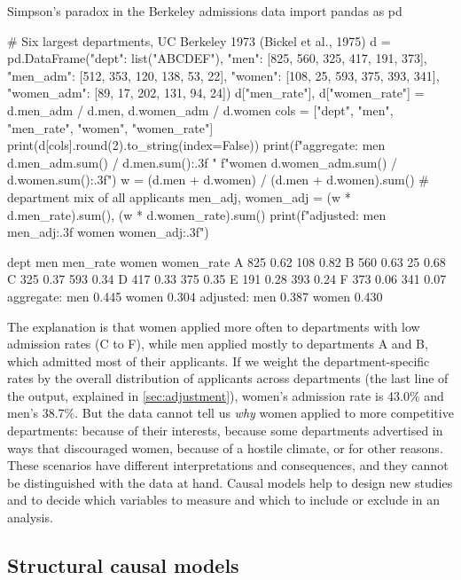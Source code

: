 \begin{pylisting}[label={lst:berkeley}]{Simpson's paradox in the Berkeley admissions data}
import pandas as pd

# Six largest departments, UC Berkeley 1973 (Bickel et al., 1975)
d = pd.DataFrame({"dept": list("ABCDEF"),
                  "men": [825, 560, 325, 417, 191, 373],
                  "men_adm": [512, 353, 120, 138, 53, 22],
                  "women": [108, 25, 593, 375, 393, 341],
                  "women_adm": [89, 17, 202, 131, 94, 24]})
d["men_rate"], d["women_rate"] = d.men_adm / d.men, d.women_adm / d.women
cols = ["dept", "men", "men_rate", "women", "women_rate"]
print(d[cols].round(2).to_string(index=False))
print(f"aggregate:   men {d.men_adm.sum() / d.men.sum():.3f}   "
      f"women {d.women_adm.sum() / d.women.sum():.3f}")
w = (d.men + d.women) / (d.men + d.women).sum()          # department mix of all applicants
men_adj, women_adj = (w * d.men_rate).sum(), (w * d.women_rate).sum()
print(f"adjusted:    men {men_adj:.3f}   women {women_adj:.3f}")
\end{pylisting}
\begin{pyoutput}
dept  men  men_rate  women  women_rate
   A  825      0.62    108        0.82
   B  560      0.63     25        0.68
   C  325      0.37    593        0.34
   D  417      0.33    375        0.35
   E  191      0.28    393        0.24
   F  373      0.06    341        0.07
aggregate:   men 0.445   women 0.304
adjusted:    men 0.387   women 0.430
\end{pyoutput}

The explanation is that women applied more often to departments with low admission rates (C to
F), while men applied mostly to departments A and B, which admitted most of their applicants.
If we weight the department-specific rates by the overall distribution of applicants across
departments (the last line of the output, explained in \cref{sec:adjustment}), women's admission
rate is 43.0\% and men's 38.7\%. But the data cannot tell us \emph{why} women applied to more
competitive departments: because of their interests, because some departments advertised in ways
that discouraged women, because of a hostile climate, or for other reasons. These scenarios have
different interpretations and consequences, and they cannot be distinguished with the data at
hand. Causal models help to design new studies and to decide which variables to measure and which
to include or exclude in an analysis.

\subsection{Structural causal models}

